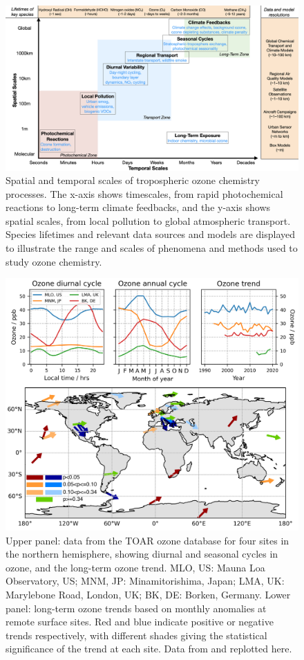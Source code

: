 \documentclass[gmd, manuscript]{copernicus}
\begin{document}
\begin{figure}
    \centering
    \includegraphics[width=0.85\linewidth]{figures/timeScales_Fig_ML4O3.001.png}
    \caption{Spatial and temporal scales of tropospheric ozone chemistry processes. The x-axis shows timescales, from rapid photochemical reactions to long-term climate feedbacks, and the y-axis shows spatial scales, from local pollution to global atmospheric transport. Species lifetimes and relevant data sources and models are displayed to illustrate the range and scales of phenomena and methods used to study ozone chemistry.}
    \label{fig:difficulties1}
\end{figure}


\begin{figure}
    \centering
    \includegraphics[width=0.7\linewidth]{figures/ozone_is_hard.png}
    \caption{Upper panel: data from the TOAR ozone database for four sites in the northern hemisphere, showing diurnal and seasonal cycles in ozone, and the long-term ozone trend. MLO, US: Mauna Loa Observatory, US; MNM, JP: Minamitorishima, Japan; LMA, UK: Marylebone Road, London, UK; BK, DE: Borken, Germany. Lower panel: long-term ozone trends based on monthly anomalies at remote surface sites. Red and blue indicate positive or negative trends respectively, with different shades giving the statistical significance of the trend at each site. Data from \citet{cooper_multi-decadal_2020} and replotted here.}
    \label{fig:difficulties2}
\end{figure}
\end{document}
